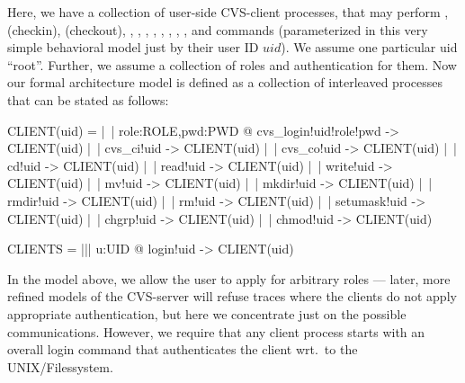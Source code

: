   Here, we have a collection of user-side CVS-client processes, that may perform
  ,  (checkin),  (checkout),
  , , , , ,
  , , ,  and
   commands (parameterized in this very simple behavioral model
  just by their user ID $uid$). We assume one particular uid ``root''.  Further,
  we assume a collection of roles and authentication for them.  Now our formal
  architecture model is defined as a collection of interleaved processes that can be
  stated as follows:
\begin{cspverb}
   CLIENT(uid) = |~| role:ROLE,pwd:PWD @ 
                     cvs_login!uid!role!pwd -> CLIENT(uid) |~| 
                     cvs_ci!uid             -> CLIENT(uid) |~|  
                     cvs_co!uid             -> CLIENT(uid) |~|  
                     cd!uid                 -> CLIENT(uid) |~|  
                     read!uid               -> CLIENT(uid) |~|  
                     write!uid              -> CLIENT(uid) |~|  
                     mv!uid                 -> CLIENT(uid) |~| 
                     mkdir!uid              -> CLIENT(uid) |~|  
                     rmdir!uid              -> CLIENT(uid) |~|  
                     rm!uid                 -> CLIENT(uid) |~| 
                     setumask!uid           -> CLIENT(uid) |~|  
                     chgrp!uid              -> CLIENT(uid) |~|  
                     chmod!uid              -> CLIENT(uid) 

   CLIENTS = ||| u:UID @ login!uid -> CLIENT(uid)
\end{cspverb}
In the model above, we allow the user to apply for arbitrary roles ---
later, more refined models of the CVS-server will refuse traces
where the clients do not apply appropriate authentication, but
here we concentrate just on the possible communications. However,
we require that any client process starts with an overall
login command that authenticates the client wrt.\ to the UNIX/Filessystem.

